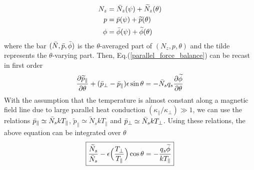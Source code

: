 \begin{equation}
\begin{split}
    N_z &= \Bar{N}_z(\psi) + \widetilde{N}_z(\theta) \\
    p &= \Bar{p}(\psi) + \widetilde{p}(\theta) \\
    \phi &= \bar{\phi}(\psi) + \widetilde{\phi}(\theta)
\end{split}
\end{equation}
where the bar $(\Bar{N}, \Bar{p}, \Bar{\phi})$ is the $\theta$-averaged part of $(N_z, p, \theta)$ and the tilde represents the $\theta$-varying part. Then, Eq.(\ref{parallel_force_balance}) can be recast in first order
\begin{equation}
    \frac{\partial \widetilde{p}_\parallel}{\partial \theta} + (\Bar{p}_\perp-\Bar{p}_\parallel)\epsilon \sin\theta = -\Bar{N}_s q_s \frac{\partial \widetilde{\phi}}{\partial \theta}
\end{equation}
With the assumption that the temperature is almost constant along a magnetic field line due to large parallel heat conduction $(\kappa_\parallel / \kappa_\perp) \gg 1$, we can use the relations $\Bar{p}_\parallel \simeq \bar{N}_s k T_\parallel$, $\widetilde{p}_\parallel \simeq \widetilde{N}_s k T_\parallel$ and $\Bar{p}_\perp \simeq \Bar{N}_s k T_\perp$. Using these relations, the above equation can be integrated over $\theta$
\begin{equation}
\boxed{\frac{\widetilde{N}_s}{\Bar{N}_s}-\epsilon \Big(\frac{T_\perp}{T_\parallel}\Big)\cos\theta = -\frac{q_s \widetilde{\phi}}{k T_\parallel}}
\end{equation}